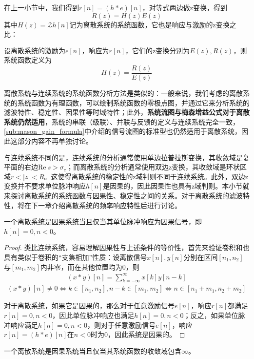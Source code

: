 在上一小节中，我们得到$r[n]=(h*e)[n]$，对等式两边做z变换，得到
\[R(z)=H(z)E(z)\]
其中$H(z)=\mathcal{Z} h[n]$记为离散系统的系统函数，它也是响应与激励的z变换之比：
\begin{definition}[离散系统的系统函数]
    设离散系统的激励为$e[n]$，响应为$r[n]$，它们的z变换分别为$E(z),R(z)$，则系统函数定义为
    \[H(z)=\frac{R(z)}{E(z)}\]
\end{definition}

离散系统与连续系统的系统函数分析方法是类似的：一般来说，我们考虑的离散系统的系统函数为有理函数，可以绘制系统函数的零极点图，并通过它来分析系统的滤波特性、稳定性、因果性等时域特性；此外，\textbf{系统流图与梅森增益公式对于离散系统仍然适用}，系统的串联（级联）、并联与反馈的定义与连续系统完全一致，\ref{sub:mason_gain_formula}中介绍的信号流图的标准型也仍然适用于离散系统，因此这部分内容不再单独讨论。

与连续系统不同的是，连续系统的分析通常使用单边拉普拉斯变换，其收敛域是复平面的右边$\text{Re}\ s>\sigma_c$；而离散系统的分析通常使用双边z变换，其收敛域是环状区域$r<|z|<R$。这使得离散系统的稳定性的z域判则不同于连续系统。此外，双边z变换并不要求单位脉冲响应$h[n]$是因果的，因此因果性也具有z域判则。本小节就来探讨离散系统的系统函数与因果性、稳定性之间的关系。对于离散系统的滤波特性，将在下一章介绍离散系统的频率响应特性后进行讨论。

\begin{proposition}[因果性的时域判则]
    一个离散系统是因果系统当且仅当其单位脉冲响应为因果信号，即$h[n]=0,n<0$。
\end{proposition}
\begin{proof}
    类比连续系统，容易理解因果性与上述条件的等价性，首先来验证卷积和也具有类似于卷积的“支集相加”性质：设离散信号$x[n],y[n]$分别在区间$[n_1,n_2]$与$[m_1,m_2]$内非零，而在其他位置均为0，则
    \begin{align*}
        (x*y)[n]=\sum_{k=-\infty}^{\infty}x[k]y[n-k]
    \end{align*}
    \begin{align*}
        (x*y)[n]\neq 0\iff k\in[n_1,n_2],n-k\in[m_1,m_2]\iff n\in[n_1+m_1,n_2+m_2]
    \end{align*}
    
    对于离散系统，如果它是因果的，那么对于任意激励信号$e[n]$，响应$r[n]$都满足$r[n]=0,n<0$，因此单位脉冲响应也满足$h[n]=0,n<0$；反之，如果单位脉冲响应满足$h[n]=0,n<0$，则对于任意激励信号$e[n]$，响应$r[n]=(h*e)[n]$在$n<0$时为0，因此系统是因果的。
\end{proof}

\begin{proposition}[因果性的z域判则]
    一个离散系统是因果系统当且仅当其系统函数的收敛域包含$\infty$。
\end{proposition}


